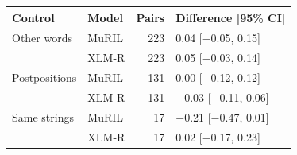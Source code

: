 \begin{tabular}{@{}llrl@{}}
\toprule
Control & Model & Pairs & Difference [95\% CI] \\
\midrule
Other words & MuRIL & 223 & 0.04 [$-$0.05, 0.15] \\
 & XLM-R & 223 & 0.05 [$-$0.03, 0.14] \\
Postpositions & MuRIL & 131 & 0.00 [$-$0.12, 0.12] \\
 & XLM-R & 131 & $-$0.03 [$-$0.11, 0.06] \\
Same strings & MuRIL & 17 & $-$0.21 [$-$0.47, 0.01] \\
 & XLM-R & 17 & 0.02 [$-$0.17, 0.23] \\
\bottomrule
\end{tabular}
